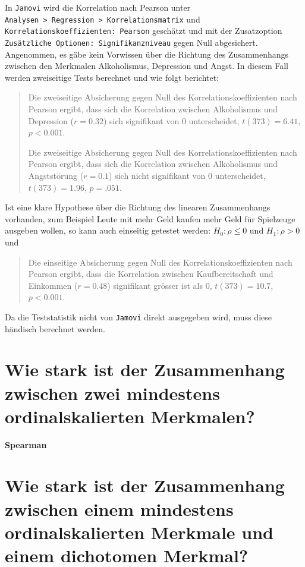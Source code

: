 \documentclass[
]{book}
\theoremstyle{definition}
\theoremstyle{definition}
\theoremstyle{definition}
\theoremstyle{definition}
\theoremstyle{remark}
\begin{document}
In \texttt{Jamovi} wird die Korrelation nach Pearson unter \texttt{Analysen\ \textgreater{}\ Regression\ \textgreater{}\ Korrelationsmatrix} und \texttt{Korrelationskoeffizienten:\ Pearson} geschätzt und mit der Zusatzoption \texttt{Zusätzliche\ Optionen:\ Signifikanzniveau} gegen Null abgesichert. Angenommen, es gäbe kein Vorwissen über die Richtung des Zusammenhangs zwischen den Merkmalen Alkoholismus, Depression und Angst. In diesem Fall werden zweiseitige Tests berechnet und wie folgt berichtet:

\begin{quote}
Die zweiseitige Absicherung gegen Null des Korrelationskoeffizienten nach Pearson ergibt, dass sich die Korrelation zwischen Alkoholismus und Depression (\(r = 0.32\)) sich signifikant von \(0\) unterscheidet, \(t(373) = 6.41\), \(p < 0.001\).

Die zweiseitige Absicherung gegen Null des Korrelationskoeffizienten nach Pearson ergibt, dass sich die Korrelation zwischen Alkoholismus und Angststörung (\(r = 0.1\)) sich nicht signifikant von \(0\) unterscheidet, \(t(373) = 1.96\), \(p = .051\).
\end{quote}

Ist eine klare Hypothese über die Richtung des linearen Zusammenhangs vorhanden, zum Beispiel Leute mit mehr Geld kaufen mehr Geld für Spielzeuge ausgeben wollen, so kann auch einseitig getestet werden: \(H_0: \rho \leq 0\) und \(H_1: \rho > 0\) und

\begin{quote}
Die einseitige Absicherung gegen Null des Korrelationskoeffizienten nach Pearson ergibt, dass die Korrelation zwischen Kaufbereitschaft und Einkommen (\(r = 0.48\)) signifikant grösser ist als \(0\), \(t(373) = 10.7\), \(p < 0.001\).
\end{quote}

Da die Teststatistik nicht von \texttt{Jamovi} direkt ausgegeben wird, muss diese händisch berechnet werden.

\section{Wie stark ist der Zusammenhang zwischen zwei mindestens ordinalskalierten Merkmalen?}\label{wie-stark-ist-der-zusammenhang-zwischen-zwei-mindestens-ordinalskalierten-merkmalen}

\label{customdef-spearman-korrelation}{\textbf{Spearman}}

\section{Wie stark ist der Zusammenhang zwischen einem mindestens ordinalskalierten Merkmale und einem dichotomen Merkmal?}\label{wie-stark-ist-der-zusammenhang-zwischen-einem-mindestens-ordinalskalierten-merkmale-und-einem-dichotomen-merkmal}
\end{document}
